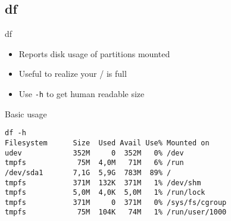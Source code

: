 \subsection{df}

\begin{frame}[fragile]{df}
  \begin{itemize}
    \pause \item Reports disk usage of partitions mounted
    \pause \item Useful to realize your / is full
    \pause \item Use \texttt{-h} to get human readable size
  \end{itemize}
  \pause
  \begin{exampleblock}{Basic usage}
    \begin{lstlisting}[showstringspaces=false]
df -h
Filesystem      Size  Used Avail Use% Mounted on
udev            352M     0  352M   0% /dev
tmpfs            75M  4,0M   71M   6% /run
/dev/sda1       7,1G  5,9G  783M  89% /
tmpfs           371M  132K  371M   1% /dev/shm
tmpfs           5,0M  4,0K  5,0M   1% /run/lock
tmpfs           371M     0  371M   0% /sys/fs/cgroup
tmpfs            75M  104K   74M   1% /run/user/1000
    \end{lstlisting}
  \end{exampleblock}
\end{frame}
